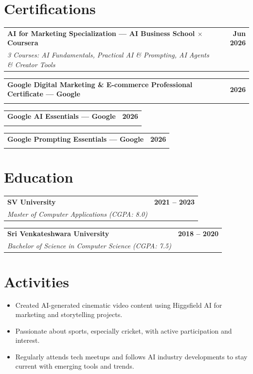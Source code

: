 \documentclass[10pt,a4paper]{article}
\newcommand{\resumeItem}[1]{\item #1}
\newcommand{\resumeSubheading}[4]{
  \begin{tabularx}{\textwidth}{X r}
    \textbf{#1} & \textbf{#2} \\
    \textit{#3} & \textit{#4} \\
  \end{tabularx}
}
\begin{document}
\section*{Certifications}

\resumeSubheading
{AI for Marketing Specialization --- AI Business School $\times$ Coursera}{Jun 2026}
{3 Courses: AI Fundamentals, Practical AI \& Prompting, AI Agents \& Creator Tools}{}

\resumeSubheading
{Google Digital Marketing \& E-commerce Professional Certificate --- Google}{2026}{}{}

\resumeSubheading
{Google AI Essentials --- Google}{2026}{}{}

\resumeSubheading
{Google Prompting Essentials --- Google}{2026}{}{}

\section*{Education}

\resumeSubheading
{SV University}{2021 -- 2023}
{Master of Computer Applications (CGPA: 8.0)}{}

\resumeSubheading
{Sri Venkateshwara University}{2018 -- 2020}
{Bachelor of Science in Computer Science (CGPA: 7.5)}{}

\section*{Activities}
\begin{itemize}
\resumeItem{Created AI-generated cinematic video content using Higgsfield AI for marketing and storytelling projects.}
\resumeItem{Passionate about sports, especially cricket, with active participation and interest.}
\resumeItem{Regularly attends tech meetups and follows AI industry developments to stay current with emerging tools and trends.}
\end{itemize}
\end{document}

